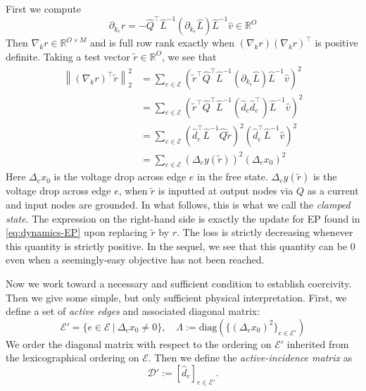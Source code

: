 \documentclass{siamart}
\begin{document}
First we compute 
\begin{equation}
    \partial_{k_e}r= -\hat{Q}^\top \hat{L}^{-1}\left(\partial_{k_e}\hat{L} \right)\hat{L}^{-1}\hat{v} \in \mathbb{R}^O
\end{equation}
Then $\nabla_k r \in \mathbb{R}^{O \times M}$ and is full row rank exactly when $(\nabla_k r)(\nabla_k r)^\top$ is positive definite. Taking a test vector $\tilde{r} \in \mathbb{R}^{O} $, we see that 
\begin{equation}
\begin{aligned}
  \left\|(\nabla_k r)^\top \tilde{r}\right\|_2^2&=  \sum_{e \in \mathcal{E}}\left(\tilde{r}^\top \hat{Q}^\top \hat{L}^{-1}\left(\partial_{k_e}\hat{L} \right)\hat{L}^{-1}\hat{v} \right)^2
  \\
  &= \sum_{e \in \mathcal{E}}\left(\tilde{r}^\top \hat{Q}^\top \hat{L}^{-1}\left(\hat{d}_e\hat{d}_e^\top \right)\hat{L}^{-1}\hat{v} \right)^2
  \\&= \sum_{e \in \mathcal{E}}\left(\hat{d}^\top _e  \hat{L}^{-1}\hat{Q}\tilde{r}\right)^2\left(\hat{d}_e^\top \hat{L}^{-1}\hat{v} \right)^2
  \\&= \sum_{e \in \mathcal{E}}\left(\Delta_ey(\tilde{r})\right)^2\left(\Delta_ex_0 \right)^2
   \end{aligned}
\end{equation}
Here $\Delta_ex_0$ is the voltage drop across edge $e$ in the free state. $\Delta_ey(\tilde{r})$ is the voltage drop across edge $e$, when $\tilde{r}$ is inputted at output nodes via $Q$ as a current and input nodes are grounded. In what follows, this is what we call the \textit{clamped state}. The expression on the right-hand side is exactly the update for EP found in \eqref{eq:dynamics-EP} upon replacing $\tilde{r}$ by $r$. The loss is strictly decreasing whenever this quantity is strictly positive. In the sequel, we see that this quantity can be $0$ even when a seemingly-easy objective has not been reached. 

Now we work toward a necessary and sufficient condition to establish coercivity. Then we give some simple, but only sufficient physical interpretation. First, we define a set of \textit{active edges} and associated diagonal matrix:
\begin{equation}
    \mathcal{E}' = \{e \in \mathcal{E} \ | \  \Delta_ex_0 \neq 0 \}, \quad \Lambda:=\text{diag}(\{(\Delta_ex_0)^2\}_{e \in \mathcal{E}'})
\end{equation}
We order the diagonal matrix with respect to the ordering on $\mathcal{E}'$ inherited from the lexicographical ordering on $\mathcal{E}.$ Then we define the\textit{ active-incidence matrix} as 
\[\mathscr{D}' := [\hat{d}_e]_{e \in \mathcal{E}'}.\] 
\end{document}
